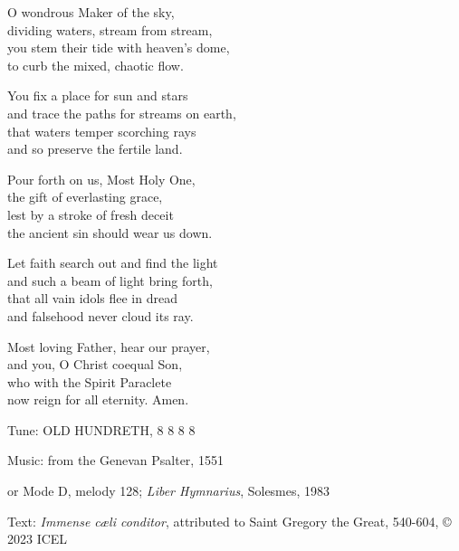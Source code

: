 \hymn

\begin{hymnverse}
O wondrous Maker of the sky,\\
dividing waters, stream from stream,\\
you stem their tide with heaven’s dome,\\
to curb the mixed, chaotic flow.

You fix a place for sun and stars\\
and trace the paths for streams on earth,\\
that waters temper scorching rays\\
and so preserve the fertile land.

Pour forth on us, Most Holy One,\\
the gift of everlasting grace,\\
lest by a stroke of fresh deceit\\
the ancient sin should wear us down.

Let faith search out and find the light\\
and such a beam of light bring forth,\\
that all vain idols flee in dread\\
and falsehood never cloud its ray.

Most loving Father, hear our prayer,\\
and you, O Christ coequal Son,\\
who with the Spirit Paraclete\\
now reign for all eternity. Amen.
\end{hymnverse}

\begin{hymnsource}
Tune: OLD HUNDRETH, 8 8 8 8

Music: from the Genevan Psalter, 1551

or Mode D, melody 128; \emph{Liber Hymnarius}, Solesmes, 1983

Text: \emph{Immense cæli conditor}, attributed to Saint Gregory the Great, 540-604, © 2023 ICEL
\end{hymnsource}